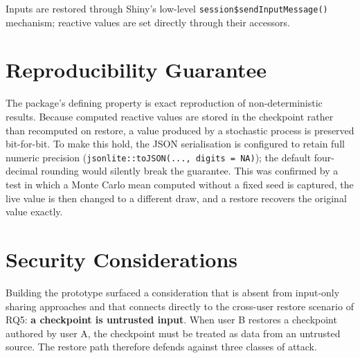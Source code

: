 \documentclass[11pt,a4paper]{article}
\begin{document}
Inputs are restored through Shiny's low-level \texttt{session\$sendInputMessage()}
mechanism; reactive values are set directly through their accessors.

\section{Reproducibility Guarantee}

The package's defining property is exact reproduction of non-deterministic
results. Because computed reactive values are stored in the checkpoint rather
than recomputed on restore, a value produced by a stochastic process is
preserved bit-for-bit. To make this hold, the JSON serialisation is configured
to retain full numeric precision (\texttt{jsonlite::toJSON(..., digits = NA)});
the default four-decimal rounding would silently break the guarantee. This was
confirmed by a test in which a Monte Carlo mean computed without a fixed seed is
captured, the live value is then changed to a different draw, and a restore
recovers the original value exactly.

\section{Security Considerations}

Building the prototype surfaced a consideration that is absent from input-only
sharing approaches and that connects directly to the cross-user restore scenario
of RQ5: \textbf{a checkpoint is untrusted input}. When user B restores a
checkpoint authored by user A, the checkpoint must be treated as data from an
untrusted source. The restore path therefore defends against three classes of
attack.
\end{document}
